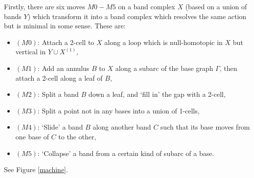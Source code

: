 Firstly, there are six moves $M0-M5$ on a band complex $X$ (based on a union of bands $Y$) which transform it into a band complex which resolves the same action but is minimal in some sense. These are:
\begin{itemize}
    \item $(M0)$: Attach a 2-cell to $X$ along a loop which is null-homotopic in $X$ but vertical in $Y\cup X^{(1)}$,
    \item $(M1)$: Add an annulus $B$ to $X$ along a subarc of the base graph $\Gamma$, then attach a 2-cell along a leaf of $B$,
    \item $(M2)$: Split a band $B$ down a leaf, and `fill in' the gap with a 2-cell,
    \item $(M3)$: Split a point not in any bases into a union of 1-cells,
    \item $(M4)$: `Slide' a band $B$ along another band $C$ such that its base moves from one base of $C$ to the other,
    \item $(M5)$: `Collapse' a band from a certain kind of subarc of a base.
\end{itemize}
See Figure \ref{machine}.
